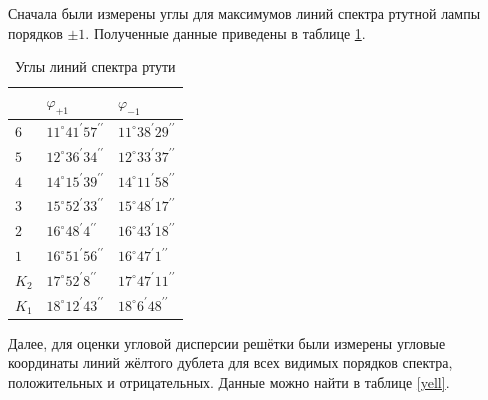 \documentclass[a4paper,12pt]{article} %
\begin{document}
Сначала были измерены углы для максимумов линий спектра ртутной лампы порядков $\pm 1$. Полученные данные приведены в таблице \ref{angles}.

\begin{table}[H]
    \centering
    \begin{tabular}{|p{2cm}|p{4cm}|p{4cm}|}
    \hline  \centering{№ линии} & $\varphi_{+1}$ &  $\varphi_{-1}$ \\ \hline
$6$   & $11^{\circ} 41^{\prime} 57^{\prime \prime}$  & $11^{\circ} 38^{\prime} 29^{\prime \prime}$  \\ \hline
$5$   & $12^{\circ} 36^{\prime} 34^{\prime \prime}$  & $12^{\circ} 33^{\prime} 37^{\prime \prime}$  \\ \hline
$4$   & $14^{\circ} 15^{\prime} 39^{\prime \prime}$  & $14^{\circ} 11^{\prime} 58^{\prime \prime}$  \\ \hline
$3$   & $15^{\circ} 52^{\prime} 33^{\prime \prime}$  & $15^{\circ} 48^{\prime} 17^{\prime \prime}$  \\ \hline
$2$   & $16^{\circ} 48^{\prime}  4^{\prime \prime}$  & $16^{\circ} 43^{\prime} 18^{\prime \prime}$  \\ \hline
$1$   & $16^{\circ} 51^{\prime} 56^{\prime \prime}$  & $16^{\circ} 47^{\prime} 1^{\prime \prime}$  \\ \hline
$K_2$ & $17^{\circ} 52^{\prime}  8^{\prime \prime}$  & $17^{\circ} 47^{\prime} 11^{\prime \prime}$  \\ \hline
$K_1$ & $18^{\circ} 12^{\prime} 43^{\prime \prime}$  & $18^{\circ}  6^{\prime } 48^{\prime \prime}$  \\ \hline

        
    
    \end{tabular}
    \caption{Углы линий спектра ртути}
    \label{angles}
\end{table}

Далее, для оценки угловой дисперсии решётки были измерены угловые координаты линий жёлтого дублета для всех видимых порядков спектра, положительных и отрицательных. Данные можно найти в таблице \ref{yell}.
\end{document}
